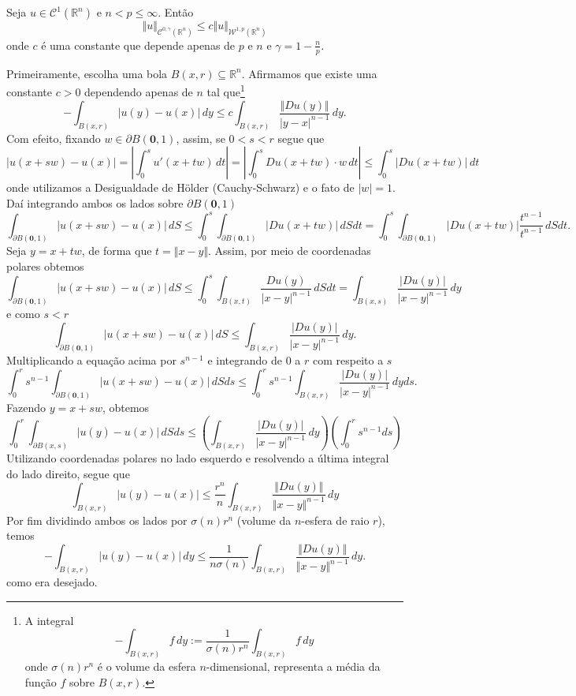 \documentclass[a4paper, 11pt]{book}
\theoremstyle{definition}
\newcommand{\bR}{\mathbb{R}}
\newcommand{\bz}{\mathbf{0}}
\newcommand{\cC}{\mathcal{C}}
\newcommand{\cW}{\mathcal{W}}
\newcommand{\sint}{-\!\!\!\!\!\!\int}
\begin{document}
\begin{tbox} \label{thm:holdersobolev1}
    Seja $u \in \cC^1(\bR^n)$ e $n < p \leqslant \infty$. Então
    \[
        \Vert u \Vert_{\cC^{0,\gamma}(\bR^n)} \leqslant c \Vert u \Vert_{\cW^{1,p}(\bR^n)}
    \]
    onde $c$ é uma constante que depende apenas de $p$ e $n$ e $\gamma = 1 - \frac{n}{p}$.
\end{tbox}
\begin{prf}
    Primeiramente, escolha uma bola $B(x,r) \subseteq \bR^n$.
    Afirmamos que existe uma constante $c > 0$ dependendo apenas de $n$ tal que\footnote{A integral
    \[
        \sint_{B(x,r)} f\,dy := \frac{1}{\sigma(n)r^n}\int_{B(x,r)} f \,dy
    \]
    onde $\sigma(n)r^n$ é o volume da esfera $n$-dimensional, representa a média da função $f$ sobre $B(x,r)$.}
    \begin{equation} \label{eq:desigualdade-uyux}
        \sint_{B(x,r)} |u(y) - u(x)| \,dy \leqslant c \int_{B(x,r)} \frac{\Vert Du(y) \Vert}{|y-x|^{n-1}} \,dy.
    \end{equation}
    Com efeito, fixando $w \in \partial B(\bz,1)$, assim, se $0 < s < r$ segue que
    \[
        |u(x + sw) - u(x)| = \left| \int_0^s u'(x + tw) \,dt \right| = \left|\int_0^s Du(x + tw) \cdot w \,dt \right| \leqslant \int_0^s |Du(x + tw)| \,dt
    \]
    onde utilizamos a Desigualdade de Hölder (Cauchy-Schwarz) e o fato de $|w| = 1$. Daí integrando ambos os lados sobre $\partial B(\bz,1)$
    {\small
    \[
        \int_{\partial B(\bz,1)} |u(x + sw) - u(x)|\,dS \leqslant \int_0^s \int_{\partial B(\bz,1)} |Du(x + tw)| \,dSdt = \int_0^s \int_{\partial B(\bz,1)} |Du(x + tw)| \frac{t^{n-1}}{t^{n-1}} \,dSdt.
    \]}\!
    Seja $y = x + tw$, de forma que $t = \Vert x - y \Vert$. Assim, por meio de coordenadas polares obtemos
    \[
        \int_{\partial B(\bz,1)} |u(x + sw) - u(x)|\,dS \leqslant \int_0^s \int_{B(x,t)} \frac{Du(y)}{|x-y|^{n-1}} \,dSdt =  \int_{B(x,s)} \frac{|Du(y)|}{|x-y|^{n-1}} \,dy
    \]
    e como $s < r$
    \[
        \int_{\partial B(\bz,1)} |u(x + sw) - u(x)|\,dS \leqslant   \int_{B(x,r)} \frac{|Du(y)|}{|x-y|^{n-1}} \,dy.
    \]
    Multiplicando a equação acima por $s^{n-1}$ e integrando de $0$ a $r$ com respeito a $s$
    \[
        \int_0^r s^{n-1} \int_{\partial B(\bz,1)} |u(x + sw) - u(x)| \,dSds \leqslant \int_0^r s^{n-1} \int_{B(x,r)} \frac{|Du(y)|}{|x-y|^{n-1}} \,dyds.
    \]
    Fazendo $y = x + sw$, obtemos
    \[
        \int_0^r \int_{\partial B(x,s)} |u(y) - u(x)|\, dSds \leqslant \left( \int_{B(x,r)} \frac{|Du(y)|}{|x-y|^{n-1}} \,dy \right) \left( \int_0^r s^{n-1} ds \right)
    \]
    Utilizando coordenadas polares no lado esquerdo e resolvendo a última integral do lado direito, segue que
    \[
        \int_{B(x,r)} |u(y) - u(x)| \leqslant \frac{r^n}{n} \int_{B(x,r)} \frac{\Vert Du(y) \Vert}{\Vert x - y \Vert^{n-1}} \,dy
    \]
    Por fim dividindo ambos os lados por $\sigma(n) r^n$ (volume da $n$-esfera de raio $r$), temos
    \[
        \sint_{B(x,r)} |u(y) - u(x)| \,dy \leqslant \frac{1}{n\sigma(n)} \int_{B(x,r)} \frac{\Vert Du(y) \Vert}{\Vert x-y \Vert^{n-1}} \,dy.
    \]
    como era desejado.


\end{prf}
\end{document}
